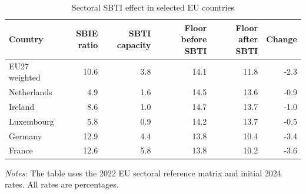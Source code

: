\begin{table}[H]
\centering
\small
\setlength{\tabcolsep}{4pt}
\caption[Sectoral SBTI effect in selected EU countries]{Sectoral SBTI effect in selected EU countries}
\label{tab:stage2_sectoral_sbti}
\begin{tabular}{@{}lrrrrr@{}}
\toprule
Country & SBIE ratio & SBTI capacity & Floor before SBTI & Floor after SBTI & Change \\
\midrule
EU27 weighted & 10.6 & 3.8 & 14.1 & 11.8 & -2.3 \\
Netherlands &  4.9 & 1.6 & 14.5 & 13.6 & -0.9 \\
Ireland &  8.6 & 1.0 & 14.7 & 13.7 & -1.0 \\
Luxembourg &  5.8 & 0.9 & 14.2 & 13.7 & -0.5 \\
Germany & 12.9 & 4.4 & 13.8 & 10.4 & -3.4 \\
France & 12.6 & 5.8 & 13.8 & 10.2 & -3.6 \\
\bottomrule
\end{tabular}

\vspace{0.35em}
\noindent\begin{minipage}{\textwidth}
\footnotesize\raggedright\textit{Notes:} The table uses the 2022 EU sectoral reference matrix and initial 2024 rates. All rates are percentages.
\end{minipage}
\end{table}

